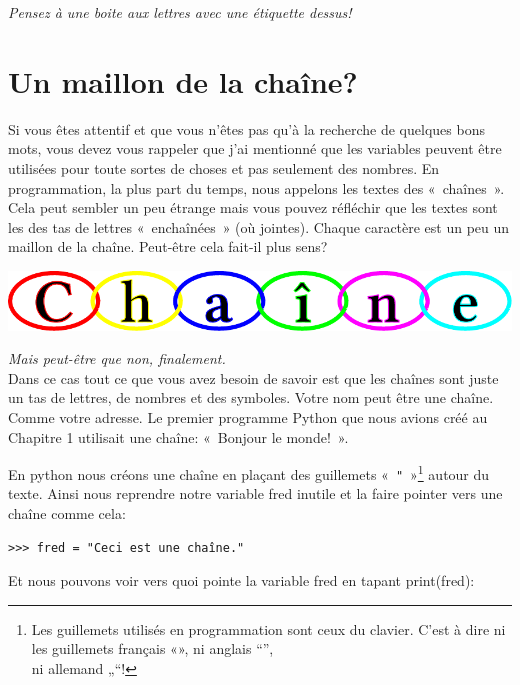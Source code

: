 \emph{Pensez à une boite aux lettres avec une étiquette dessus!}



\section{Un maillon de la chaîne?}

Si vous êtes attentif et que vous n'êtes pas qu'à la recherche de quelques bons mots, vous devez vous rappeler que j'ai mentionné que les variables peuvent être utilisées  pour toute sortes de choses et pas seulement des nombres.
En programmation, la plus part du temps, nous appelons les textes des «~chaînes~». Cela peut sembler un peu étrange mais vous pouvez réfléchir que les textes sont les des tas de lettres «~enchaînées~» (où jointes). Chaque caractère est un peu un maillon de la chaîne. Peut-être cela fait-il plus sens?\\
\begin{center}
\includegraphics[scale=1]{images/chaine.pdf} 
\end{center}

\emph{Mais peut-être que non, finalement.}\\


Dans ce cas tout ce que vous avez besoin de savoir est que les chaînes sont juste un tas de lettres, de nombres et 
 des symboles. Votre nom peut être une chaîne. Comme votre adresse. Le premier programme Python que nous avions créé au Chapitre 1 utilisait une chaîne: «~Bonjour le monde!~». 


En python nous créons une chaîne en plaçant des guillemets «~\texttt{"}~»\footnote{Les guillemets utilisés en programmation sont ceux du clavier. C'est à dire ni les guillemets français «», ni anglais “”,\\ ni allemand  „“!} autour du texte. Ainsi nous reprendre notre variable 
fred inutile et la faire pointer vers une chaîne comme cela:

\begin{Verbatim}[frame=single,rulecolor=\color{mbleu}, label=à taper]
>>> fred = "Ceci est une chaîne."
\end{Verbatim}

Et nous pouvons voir vers quoi pointe la variable fred en tapant print(fred):

